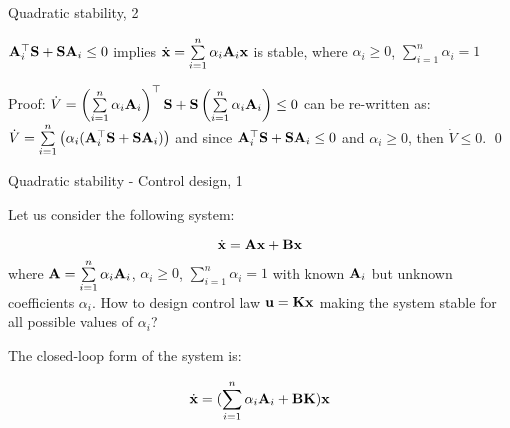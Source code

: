 \documentclass{beamer}
\begin{document}
\begin{frame}{Quadratic stability, 2}
	\begin{flushleft}
		
		\begin{theorem}
			$\mathbf{A}_i^\top \mathbf{S} + \mathbf{S} \mathbf{A}_i \leq 0$ implies $\dot{\mathbf{x}}  = \sum\limits_{i=1}^{n} \alpha_i \mathbf{A}_i \mathbf{x}$ is stable, where $\alpha_i \geq 0$, $\sum\limits_{i=1}^{n} \alpha_i = 1$
		\end{theorem}
		
		\bigskip
		
		Proof: $\dot V = \left(\sum\limits_{i=1}^{n} \alpha_i \mathbf{A}_i \right)^\top \mathbf{S} + \mathbf{S} 
		\left( \sum\limits_{i=1}^{n} \alpha_i \mathbf{A}_i \right) \leq 0$ can be re-written as: 
		$\dot V = \sum\limits_{i=1}^{n} \left( \alpha_i (\mathbf{A}_i^\top \mathbf{S} + \mathbf{S} \mathbf{A}_i) \right) $ and since $\mathbf{A}_i^\top \mathbf{S} + \mathbf{S} \mathbf{A}_i \leq 0$ and $\alpha_i \geq 0$, then $\dot V \leq 0$. \qed
		
	\end{flushleft}
\end{frame}




\begin{frame}{Quadratic stability - Control design, 1}
	\begin{flushleft}
		
		Let us consider the following system:
		
		\begin{equation}
			\dot{\mathbf{x}}  = \mathbf{A}\mathbf{x} + \mathbf{B}\mathbf{x}
		\end{equation}
		where $\mathbf{A} = \sum\limits_{i=1}^{n} \alpha_i \mathbf{A}_i$, $\alpha_i \geq 0$, $\sum\limits_{i=1}^{n} \alpha_i = 1$ with known $\mathbf{A}_i$ but unknown coefficients $\alpha_i$. How to design control law $\mathbf{u} = \mathbf{K}\mathbf{x}$ making the system stable for all possible values of $\alpha_i$? 
		
		\bigskip
		
		The closed-loop form of the system is:
		
		\begin{equation}
			\dot{\mathbf{x}}  = (\sum\limits_{i=1}^{n} \alpha_i \mathbf{A}_i + \mathbf{B}\mathbf{K})\mathbf{x}
		\end{equation}
		
		
	\end{flushleft}
\end{frame}
\end{document}
